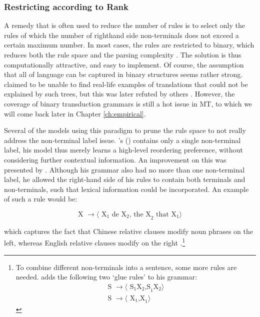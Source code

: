 \documentclass{report}
\theoremstyle{definition}
\theoremstyle{plain}
\def\citepos#1{\citeauthor{#1}'s (\citeyear{#1})}
\begin{document}
\subsubsection{Restricting according to Rank}

A remedy that is often used to reduce the number of rules is to select only the rules of which the number of righthand side non-terminals does not exceed a certain maximum number. In most cases, the rules are restricted to binary, which reduces both the rule space and the parsing complexity \citep[e.g,]{wu1997stochastic,chiang2005hierarchical,mylonakis2011learning}. The solution is thus computationally attractive, and easy to implement. Of course, the assumption that all of language can be captured in binary structures seems rather strong. \citeauthor{wu1997stochastic} claimed to be unable to find real-life examples of translations that could not be explained by such trees, but this was later refuted by others \citep[e.g.,][maybe meer refs?]{galley2004s}. However, the coverage of binary transduction grammars is still a hot issue in MT, to which we will come back later in Chapter \ref{ch:empirical}. 

Several of the models using this paradigm to prune the rule space to not really address the non-terminal label issue. \citepos{wu1995algorithm} contains only a single non-terminal label, his model thus merely learns a high-level reordering preference, without considering further contextual information. An improvement on this was presented by \cite{chiang2005hierarchical,chiang2007hierarchical}. Although his grammar also had no more than one non-terminal label, he allowed the right-hand side of his rules to contain both terminals and non-terminals, such that lexical information could be incorporated. An example of such a rule would be:

\[
\text{X } \rightarrow \langle\text{ X}_1 \text{ de X}_2 \text{, the X}_2 \text{ that X}_1\rangle
\]

which captures the fact that Chinese relative clauses modify noun phrases on the left, whereas English relative clauses modify on the right \citep{chiang2007hierarchical}.\footnote{To combine different non-terminals into a sentence, some more rules are needed. \cite{chiang2007hierarchical} adds the following two `glue rules' to his grammar:\begin{align*}
 \text{S } \rightarrow \langle\text{ S}_1\text{X}_2 \text{,S}_1\text{X}_2\rangle\\
\text{S } \rightarrow \langle\text{ X}_1 \text{,X}_1\rangle 
\end{align*}

}
\end{document}
